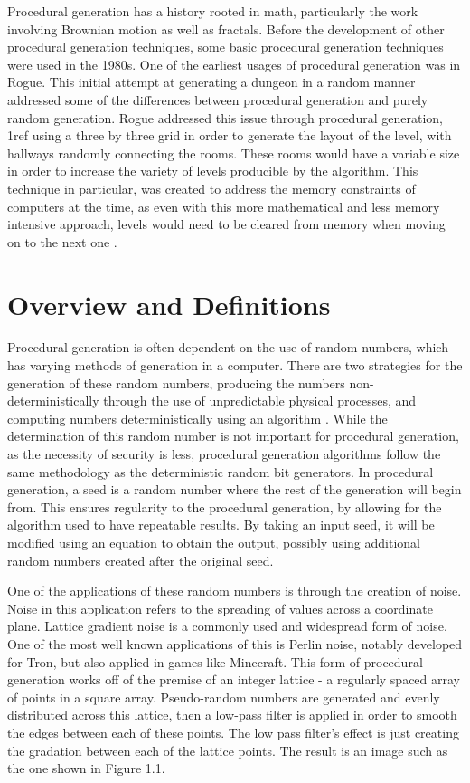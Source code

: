 \documentclass[10pt]{report}
\begin{document}
		Procedural generation has a history rooted in math, particularly the work involving Brownian motion as well as fractals. Before the development of other procedural generation techniques, some basic procedural generation techniques were used in the 1980s. One of the earliest usages of procedural generation was in Rogue. This initial attempt at generating a dungeon in a random manner addressed some of the differences between procedural generation and purely random generation. Rogue addressed this issue through procedural generation, 1ref using a three by three grid in order to generate the layout of the level, with hallways randomly connecting the rooms. These rooms would have a variable size in order to increase the variety of levels producible by the algorithm. This technique in particular, was created to address the memory constraints of computers at the time, as even with this more mathematical and less memory  intensive approach, levels would need to be cleared from memory when moving on to the next one \cite{rogue}.
		
		\section{Overview and Definitions}
		
		Procedural generation is often dependent on the use of random numbers, which has varying methods of generation in a computer. There are two strategies for the generation of these random numbers, producing the numbers non-deterministically through the use of unpredictable physical processes, and computing numbers deterministically using an algorithm \cite{rng}. While the determination of this random number is not important for procedural generation, as the necessity of security is less, procedural generation algorithms follow the same methodology as the deterministic random bit generators. In procedural generation, a seed is a random number where the rest of the generation will begin from. This ensures regularity to the procedural generation, by allowing for the algorithm used to have repeatable results. By taking an input seed, it will be modified using an equation to obtain the output, possibly using additional random numbers created after the original seed.
		
		One of the applications of these random numbers is through the creation of noise. Noise in this application refers to the spreading of values across a coordinate plane. Lattice gradient noise is a commonly used and widespread form of noise. One of the most well known applications of this is Perlin noise, notably developed for Tron, but also applied in games like Minecraft. This form of procedural generation works off of the premise of an integer lattice - a regularly spaced array of points in a square array\cite{integer-lattice}. Pseudo-random numbers are generated and evenly distributed across this lattice, then a low-pass filter is applied in order to smooth the edges between each of these points. The low pass filter's effect is just creating the gradation between each of the lattice points. The result is an image such as the one shown in Figure 1.1.
		
\end{document}
